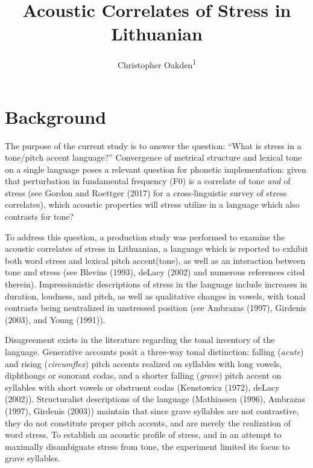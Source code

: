 \documentclass[english,man]{apa6}
\title{Acoustic Correlates of Stress in Lithuanian}
\author{Christopher Oakden\textsuperscript{1}}
\affiliation{
    \vspace{0.5cm}
          \textsuperscript{1} Rutgers University  }
\theoremstyle{definition}
\theoremstyle{definition}
\theoremstyle{definition}
\theoremstyle{remark}
\begin{document}
\maketitle

\setcounter{secnumdepth}{0}



\section{Background}\label{background}

The purpose of the current study is to answer the question:
\enquote{What is stress in a tone/pitch accent language?} Convergence of
metrical structure and lexical tone on a single language poses a
relevant question for phonetic implementation: given that perturbation
in fundamental frequency (F0) is a correlate of tone \textit{and} of
stress (see Gordon and Roettger (2017) for a cross-linguistic survey of
stress correlates), which acoustic properties will stress utilize in a
language which also contrasts for tone?

To address this question, a production study was performed to examine
the acoustic correlates of stress in Lithuanian, a language which is
reported to exhibit both word stress and lexical pitch accent(tone), as
well as an interaction between tone and stress (see Blevins (1993),
deLacy (2002) and numerous references cited therein). Impressionistic
descriptions of stress in the language include increases in duration,
loudness, and pitch, as well as qualitative changes in vowels, with
tonal contrasts being neutralized in unstressed position (see Ambrazas
(1997), Girdenis (2003), and Young (1991)).

Disagreement exists in the literature regarding the tonal inventory of
the language. Generative accounts posit a three-way tonal distinction:
falling (\textit{acute}) and rising (\textit{circumflex}) pitch accents
realized on syllables with long vowels, diphthongs or sonorant codas,
and a shorter falling (\textit{grave}) pitch accent on syllables with
short vowels or obstruent codas (Kenstowicz (1972), deLacy (2002)).
Structuralist descriptions of the language (Mathiassen (1996), Ambrazas
(1997), Girdenis (2003)) maintain that since grave syllables are not
contrastive, they do not constitute proper pitch accents, and are merely
the realization of word stress. To establish an acoustic profile of
stress, and in an attempt to maximally disambiguate stress from tone,
the experiment limited its focus to grave syllables.
\end{document}
